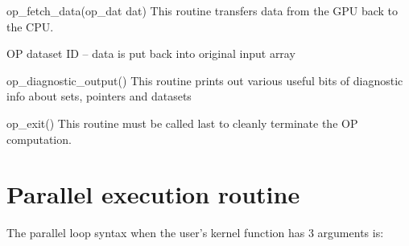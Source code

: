 \begin{routine} {op\_fetch\_data(op\_dat dat)}
{This routine transfers data from the GPU back to the CPU.}
\item[dat]           OP dataset ID -- data is put back into original input array 
\end{routine}


\begin{routine} {op\_diagnostic\_output()}
{This routine prints out various useful bits of diagnostic info about sets, pointers and datasets}
\item \vspace{-0.3in}
\end{routine}


\begin{routine} {op\_exit()}
{This routine must be called last to cleanly terminate the OP computation.}
\item \vspace{-0.3in}
\end{routine}



\newpage
\section{Parallel execution routine}

The parallel loop syntax when the user's kernel function has 3 arguments is:

